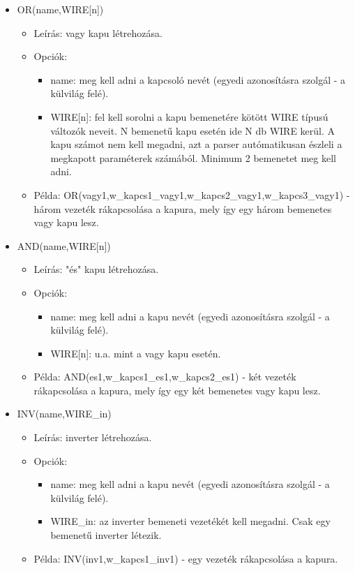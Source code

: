 \begin{itemize}
\item OR(name,WIRE[n])
	\begin{itemize}
	\item Leírás: vagy kapu létrehozása.
	\item Opciók: 
		\begin{itemize}
			\item name: meg kell adni a kapcsoló nevét (egyedi azonosításra szolgál - a külvilág felé).
			\item WIRE[n]: fel kell sorolni a kapu bemenetére kötött WIRE típusú változók neveit. N bemenetű kapu esetén ide N db WIRE kerül. A kapu számot nem kell megadni, azt a parser autómatikusan észleli a megkapott paraméterek számából. Minimum 2 bemenetet meg kell adni.
		\end{itemize}
	\item Példa: OR(vagy1,w\_kapcs1\_vagy1,w\_kapcs2\_vagy1,w\_kapcs3\_vagy1) - három vezeték rákapcsolása a kapura, mely így egy három bemenetes vagy kapu lesz.
	\end{itemize}

\item AND(name,WIRE[n])
	\begin{itemize}
	\item Leírás: "és" kapu létrehozása.
	\item Opciók: 
		\begin{itemize}
			\item name: meg kell adni a kapu nevét (egyedi azonosításra szolgál - a külvilág felé).
			\item WIRE[n]: u.a. mint a vagy kapu esetén.
		\end{itemize}
	\item Példa: AND(es1,w\_kapcs1\_es1,w\_kapcs2\_es1) - két vezeték rákapcsolása a kapura, mely így egy két bemenetes vagy kapu lesz.
	\end{itemize}
	
\item INV(name,WIRE\_in)
	\begin{itemize}
	\item Leírás: inverter létrehozása.
	\item Opciók: 
		\begin{itemize}
			\item name: meg kell adni a kapu nevét (egyedi azonosításra szolgál - a külvilág felé).
			\item WIRE\_in: az inverter bemeneti vezetékét kell megadni. Csak egy bemenetű inverter létezik.
		\end{itemize}
	\item Példa: INV(inv1,w\_kapcs1\_inv1) - egy vezeték rákapcsolása a kapura.
	\end{itemize}
	

\end{itemize}
